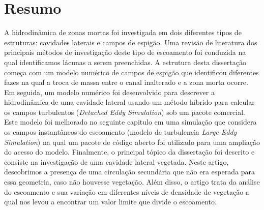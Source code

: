 \chapter*{Resumo}
A hidrodinâmica de zonas mortas foi investigada em dois diferentes tipos de estruturas: cavidades laterais e campos de espigão. Uma revisão de literatura dos principais métodos de investigação deste tipo de escoamento foi conduzida na qual identificamos lácunas a serem preenchidas. A estrutura desta dissertação começa com um modelo numérico de campos de espigão que identificou diferentes fazes na qual a troca de massa entre o canal inalterado e a zona morta ocorre. Em seguida, um modelo numérico foi desenvolvido para descrever a hidrodinâmica de uma cavidade lateral usando um método híbrido para calcular os campos turbulentos (\textit{Detached Eddy Simulation}) sob um pacote comercial. Este modelo foi melhorado no seguinte capitulo em uma simulação que considera os campos instantâneos do escoamento (modelo de turbulencia \textit{Large Eddy Simulation}) na qual um pacote de código aberto foi utilizado para uma ampliação do acesso do modelo. Finalmente, o principal tópico da dissertação foi descrito e consiste na investigação de uma cavidade lateral vegetada. Neste artigo, descobrimos a presença de uma circulação secundária que não era esperada para essa geometria, caso não houvesse vegetação. Além disso, o artigo trata da análise do escoamento e sua variação em diferentes níveis de densidade de vegetação a qual nos levou a encontrar um valor limite que divide o escoamento.
